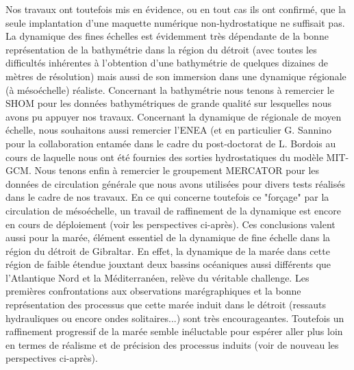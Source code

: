 Nos travaux ont toutefois mis en évidence, ou en tout cas ils ont confirmé, que la seule implantation d'une maquette numérique non-hydrostatique ne suffisait pas. La dynamique des fines échelles est évidemment très dépendante de la bonne représentation de la bathymétrie dans la région du détroit (avec toutes les difficultés inhérentes à l'obtention d'une bathymétrie de quelques dizaines de mètres de résolution) mais aussi de son immersion dans une dynamique régionale (à mésoéchelle) réaliste. Concernant la bathymétrie nous tenons à remercier le SHOM pour les données bathymétriques de grande qualité sur lesquelles nous avons pu appuyer nos travaux. Concernant la dynamique de régionale de moyen échelle, nous souhaitons aussi  remercier l'ENEA (et en particulier G. Sannino pour la collaboration entamée dans le cadre du post-doctorat de L. Bordois au cours  de laquelle nous ont été fournies des sorties hydrostatiques du modèle MIT-GCM. Nous tenons enfin à remercier le groupement MERCATOR pour les données de circulation générale que nous avons utilisées pour divers tests réalisés dans le cadre de nos travaux. En ce qui concerne toutefois ce "forçage" par la circulation de mésoéchelle, un travail de raffinement de la dynamique est encore en cours de déploiement (voir les perspectives ci-après). Ces conclusions valent aussi pour la marée, élément essentiel de la dynamique de fine échelle dans la région du détroit de Gibraltar. En effet, la dynamique de la marée dans cette région de faible étendue jouxtant deux bassins océaniques aussi différents que l'Atlantique Nord et la Méditerranéen, relève du véritable challenge. Les premières confrontations aux observations marégraphiques et la bonne représentation des processus que cette marée induit dans le détroit (ressauts hydrauliques ou encore ondes solitaires...) sont très encourageantes. Toutefois un raffinement progressif de la marée semble inéluctable pour espérer aller plus loin en termes de réalisme et de précision des processus induits (voir de nouveau les perspectives ci-après).\\


